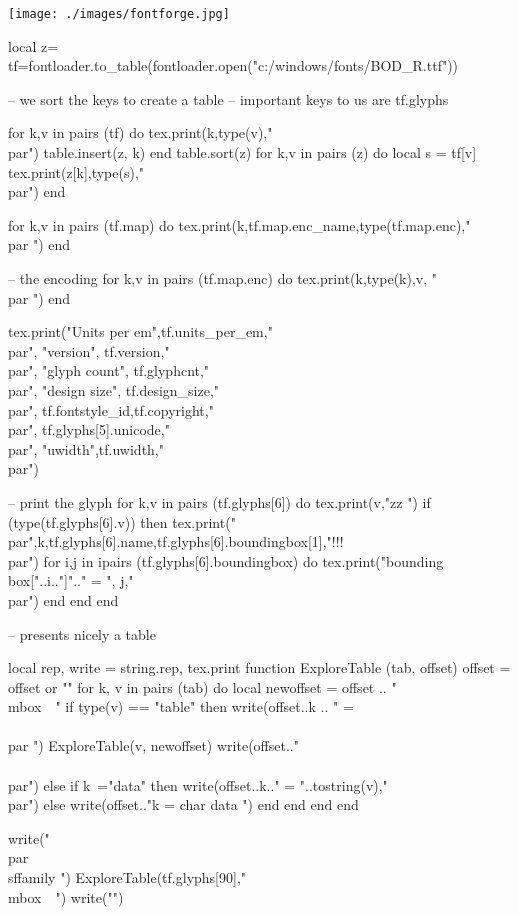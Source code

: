 \documentclass{article}
\begin{document}
\texttt{[image: ./images/fontforge.jpg]}
\newfontfamily{}
\begin{luacode*}
local z={}
tf=fontloader.to_table(fontloader.open("c:/windows/fonts/BOD_R.ttf"))

-- we sort the keys to create a table
-- important keys to us are tf.glyphs

for k,v in pairs (tf) do
   tex.print(k,type(v),"\\par")
   table.insert(z, k)
end
table.sort(z)
for k,v in pairs (z) do
   local s = tf[v]
   tex.print(z[k],type(s),"\\par")
end

for k,v in pairs (tf.map) do
   tex.print(k,tf.map.enc_name,type(tf.map.enc),"\\par ")
end

-- the encoding
for k,v in pairs (tf.map.enc) do
   tex.print(k,type(k),v, "\\par ")
end

tex.print("Units per em",tf.units_per_em,"\\par",
          "version", tf.version,"\\par",
          "glyph count", tf.glyphcnt,"\\par",
          "design size", tf.design_size,"\\par",
           tf.fontstyle_id,tf.copyright,"\\par",
           tf.glyphs[5].unicode,"\\par", 
          "uwidth",tf.uwidth,"\\par")

-- print the glyph
for k,v in pairs (tf.glyphs[6]) do
    tex.print(v,"zz ")
    if (type(tf.glyphs[6].v)) then tex.print("\\par",k,tf.glyphs[6].name,tf.glyphs[6].boundingbox[1],"!!!\\par")  
      for i,j in ipairs (tf.glyphs[6].boundingbox) do
        tex.print("bounding box["..i.."]".." = ", j,"\\par")
      end 
    end
end




-- presents nicely a table 

local rep, write = string.rep, tex.print
function ExploreTable (tab, offset)
    offset = offset or ""
    for k, v in pairs (tab) do
        local newoffset = offset .. "\\mbox{~~}"
        if type(v) == "table" then
           write(offset..k .. " = \\{\\par ")
           ExploreTable(v, newoffset)
           write(offset.."\\}\\par")
        else
         if k~="data" then write(offset..k.." =  "..tostring(v),"\\par") 
           else
                 write(offset.."k = char data ")
           end
       end
    end
end

write("\\par{\\sffamily ")
 ExploreTable(tf.glyphs[90],"\\mbox{~~}")
write("}")

\end{luacode*}
\end{document}
